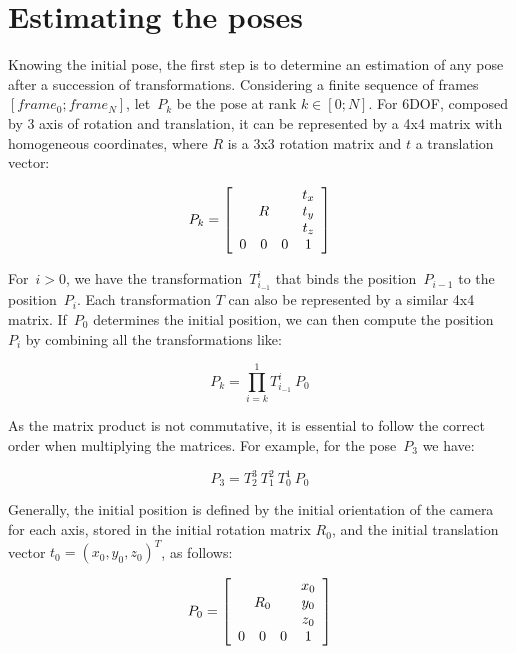 \section{Estimating the poses}

Knowing the initial pose, the first step is to determine an estimation of any pose after a succession of transformations. Considering a finite sequence of frames $[frame_0 ; frame_N]$, let~$P_k$ be the pose at rank $k \in [0;N]$. For 6\gls{DOF}, composed by 3 axis of rotation and translation, it can be represented by a 4x4 matrix with homogeneous coordinates, where $R$ is a 3x3 rotation matrix and $t$ a translation vector:

$$
P_k = \left[ \begin{array}{cccc}
 \multicolumn{3}{c}{\multirow{3}{*}{$R$}} & t_x \\
 & & & t_y \\
 & & & t_z \\
0 & 0 & 0 & 1 \end{array} \right] 
$$

For~$i>0$, we have the transformation~$T_{i_{-1}}^i$ that binds the position~$P_{i-1}$ to the position~$P_i$. Each transformation $T$ can also be represented by a similar 4x4 matrix. If~$P_0$ determines the initial position, we can then compute the position~$P_i$  by combining all the transformations like:

\begin{equation}
P_k = \prod_{i=k}^1{T_{i_{-1}}^i} \: P_0
\label{eqn:pose_estimation}
\end{equation}

As the matrix product is not commutative, it is essential to follow the correct order when multiplying the matrices. For example, for the pose~$P_3$ we have:

\[
P_3 = T_2^3 \: T_1^2 \: T_0^1 \: P_0
\]

Generally, the initial position is defined by the initial orientation of the camera for each axis, stored in the initial rotation matrix $R_0$, and the initial translation vector $t_0 = (x_0, y_0, z_0)^T$, as follows:

\[
P_0 = \left[ \begin{array}{cccc}
 \multicolumn{3}{c}{\multirow{3}{*}{$R_0$}} & x_0 \\
 & & & y_0 \\
 & & & z_0 \\
0 & 0 & 0 & 1 \end{array} \right] 
\]

